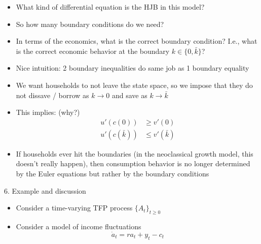 \documentclass[10pt]{beamer}
\begin{document}
\begin{frame}{}
\begin{itemize}
\item What kind of differential equation is the HJB in this model?

\item So how many boundary conditions do we need?

\item In terms of the economics, what is the correct boundary condition? I.e., what is the correct economic behavior at the boundary $k \in \{0, \bar k\}$? 

\item Nice intuition: 2 boundary inequalities do same job as 1 boundary equality

\item We want households to not leave the state space, so we impose that they do not dissave / borrow as $k \to 0$ and save as $k \to \bar k$

\item This implies: (why?)
\begin{align*}
	u'(c(0)) &\geq v'(0) \\
	u'(c(\bar k)) &\leq v'(\bar k)
\end{align*}

\item  If households ever hit the boundaries (in the neoclassical growth model, this doesn't really happen), then consumption behavior is no longer determined by the Euler equations but rather by the boundary conditions 

\end{itemize}
\end{frame}




\begin{frame}{6. Example and discussion}
\begin{itemize}
\item Consider a time-varying TFP process $\{A_t\}_{t \geq 0}$

\item Consider a model of income fluctuations
\begin{equation*}
	\dot a_t = r a_t + y_t - c_t 
\end{equation*}
\end{itemize}
\end{frame}







\appendix
\end{document}
